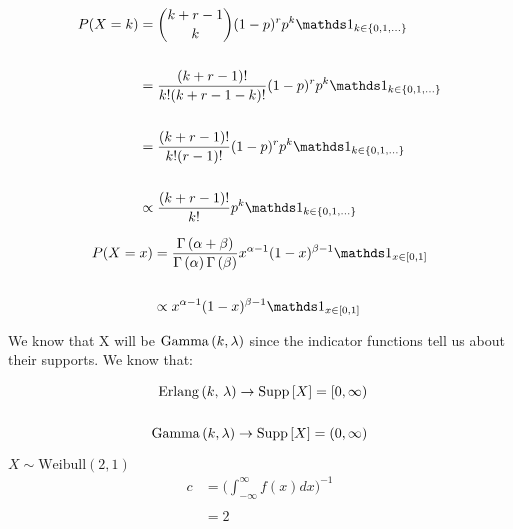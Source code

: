 \documentclass[12pt]{article}
\begin{document}
\begin{enumerate}


\begin{align*}
    P(X=k) &=  {k+r-1 \choose k} (1-p)^r p^k \indic{k \in \{0, 1, \ldots \}} \\ \\
    &= \frac{(k+r-1)!}{k!(k+r-1-k)!} (1-p)^r p^k \indic{k \in \{0, 1, \ldots \}} \\ \\ 
    &= \frac{(k+r-1)!}{k!(r-1)!} (1-p)^r p^k \indic{k \in \{0, 1, \ldots \}} \\ \\ 
    &\propto \frac{(k+r-1)!}{k!} p^k \indic{k \in \{0, 1, \ldots \}}
\end{align*}


\begin{align*}
    P(X=x) &= \frac{\Gammaf{\alpha + \beta}}{\Gammaf{\alpha}\Gammaf{\beta}} x^{\alpha-1} (1-x)^{\beta-1} \indic{x \in [0, 1]} \\ \\
    &\propto x^{\alpha-1} (1-x)^{\beta-1} \indic{x \in [0, 1]} 
\end{align*}



We know that X will be $\mathrm{Gamma}\left(k, \lambda\right)$ since the indicator functions tell us about their supports. We know that:

\begin{align*}
    \mathrm{Erlang}\left(k,\,\lambda\right) \rightarrow \text{Supp}\left[X\right] = [0, \infty) \\ \\
    \mathrm{Gamma}\left(k, \lambda\right) \rightarrow \text{Supp}\left[X\right] = (0, \infty)
\end{align*}


$X \sim \text{Weibull}(2, 1)$
\begin{align*}
    c &= \Big(\int_{-\infty}^{\infty} f(x) dx \Big)^{- 1} \\ \\ 
    &= 2 \\ \\
\end{align*}





\end{enumerate}
\end{document}
